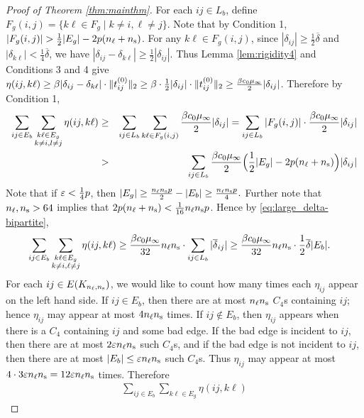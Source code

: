 \begin{proof}[Proof of Theorem \ref{thm:mainthm}]
For each $ij\in L_{b}$, define $F_g(i,j) = \{k\ell \in F_g \mid k \neq i, \ell \neq j\}$. Note that by Condition 1, $|F_g(i,j)| > \frac{1}{2} |E_g| - 2 p (n_\ell + n_\text{s})$. For any $k\ell \in F_g(i,j)$, since $|\delta_{ij}| \ge \frac{1}{2} \overline{\delta}$ and $|\delta_{k\ell}| < \frac{1}{4}\overline{\delta}$, we have $|\delta_{ij} - \delta_{k\ell}| \ge \frac{1}{2}|\delta_{ij}|$. Thus
Lemma \ref{lem:rigidity4}
and Conditions 3 and 4 give $\eta(ij,k\ell)\ge \beta|\delta_{ij} - \delta_{k\ell}| \cdot\|t^{{(0)}}_{ij}\|_2 \ge
\beta \cdot \frac{1}{2}|\delta_{ij}| \cdot \|t^{{(0)}}_{ij}\|_2 \ge
\frac{\beta c_{0}\mu_{\infty}}{2}|\delta_{ij}|$. 
Therefore by Condition 1, 
\begin{eqnarray*}
	\sum_{ij\in E_{b}}\sum_{\substack{k\ell\in E_{g}\\k\neq i, l \neq j}}\eta(ij,k\ell) 
	& \ge & \sum_{ij\in L_{b}}\sum_{k\ell\in F_{g}(i,j)}\frac{\beta c_{0}\mu_{\infty}}{2}|\delta_{ij}|=\sum_{ij\in L_{b}}|F_{g}(i,j)|\cdot\frac{\beta c_{0}\mu_{\infty}}{2}|\delta_{ij}|\\
	& >  & \sum_{ij\in L_{b}}\frac{\beta c_{0}\mu_{\infty}}{2}\Bigl(\frac{1}{2}|E_{g}|  - 2p (n_\ell + n_\text{s}) \Bigr)|\delta_{ij}|
\end{eqnarray*}
Note that if $\varepsilon < \frac{1}{4}p$, then $|E_g| \geq \frac{n_\ell n_\text{s} p}{2} - |E_b| \geq \frac{n_\ell n_\text{s} p}{4}.$
Further note that $n_\ell, n_\text{s} > 64$ implies that $2 p (n_\ell + n_\text{s}) < \frac{1}{16}n_\ell n_\text{s} p$.  Hence by \eqref{eq:large_delta-bipartite},
\begin{align*}
	\sum_{ij\in E_{b}}\sum_{\substack{k\ell\in E_{g}\\k\neq i, \ell \neq j}}\eta(ij,k\ell)
	& \ge\frac{\beta c_{0}\mu_{\infty}}{32} n_\ell n_\text{s} \cdot \sum_{ij\in L_{b}} |\overline{\delta}_{ij}|
	\ge\frac{\beta c_{0}\mu_{\infty}}{32} n_\ell n_\text{s} \cdot\frac{1}{2}\overline{\delta}|E_{b}|.
\end{align*}
For
each $ij\in E(K_{n_\ell, n_\text{s}})$, we would like to count how many times each
$\eta_{ij}$ appear on the left hand side. If $ij\in E_{b}$, then
there are at most $n_\ell n_\text{s}$ $C_{4}$s  containing
$ij$; hence $\eta_{ij}$ may appear at most $4 n_\ell n_\text{s}$
times. If $ij\notin E_{b}$, then $\eta_{ij}$ appears when there is
a $C_{4}$ containing $ij$ and some bad edge.  If the
bad edge is incident to $ij$, then there are at most
$2\varepsilon n_\ell n_\text{s}$ such $C_{4}$s, and if the bad edge is
not incident to $ij$, then there are at most $|E_{b}|\le\varepsilon n_\ell n_\text{s}$
such $C_{4}$s. Thus $\eta_{ij}$ may appear at most $4 \cdot 3 \varepsilon n_\ell n_\text{s} = 12 \varepsilon n_\ell n_\text{s}$ times. Therefore
\begin{eqnarray*}
	\sum_{ij\in E_{b}}\sum_{k\ell\in E_{g}}\eta(ij,k\ell) 

\end{eqnarray*}
\end{proof}
